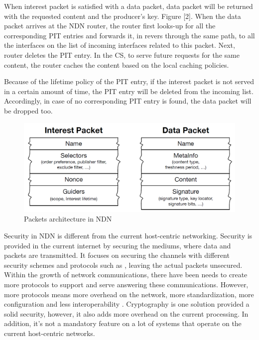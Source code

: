 \documentclass[twocolumn]{article}
\begin{document}
When interest packet is satisfied with a data packet, data packet will be returned with the requested content and the producer's key. Figure [2]. When the data packet arrives at the NDN router, the router first looks-up for all the corresponding PIT entries and forwards it, in revers through the same path, to all the interfaces on the list of incoming interfaces related to this packet. Next, router deletes the PIT entry. In the CS, to serve future requests for the same content, the router caches the content based on the local caching policies. 

Because of the lifetime policy of the PIT entry, if the interest packet is not served in a certain amount of time, the PIT entry will be deleted from the incoming list. Accordingly, in case of no corresponding PIT entry is found, the data packet will be dropped too.

\begin{figure} [ht]
    \centering
    \includegraphics[width=\columnwidth]{NDN_Packets.png}
    \caption{\small Packets architecture in NDN}
    \label{fig:my_label1}
\end{figure}
  
Security in NDN is different from the current host-centric networking. Security is provided in the current internet by securing the mediums, where data and packets are transmitted. It focuses on securing the channels with different security schemes and protocols such as \cite{NGUYEN201517}\cite{661700}\cite{Fumy1998}\cite{Prentice-Hall:2000:ISP:518066}, leaving the actual packets unsecured. Within the growth of network communications, there have been needs to create more protocols to support and serve answering these communications. However, more protocols means more overhead on the network, more standardization, more configuration and less interoperability \cite{cholez:hal-00785298}. Cryptography is one solution provided a solid security, however, it also adds more overhead on the current processing. In addition, it's not a mandatory feature on a lot of systems that operate on the current host-centric networks.
\end{document}
